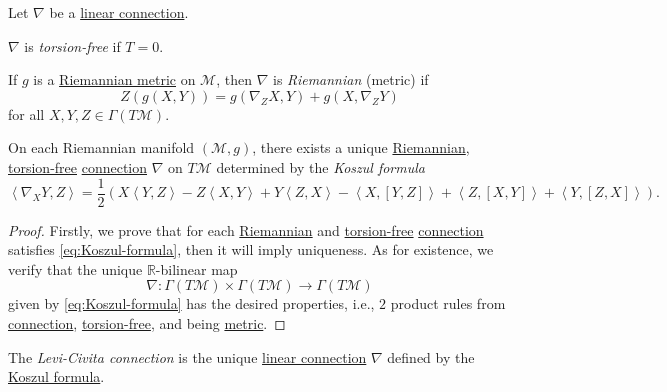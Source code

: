 \begin{definition*}
	Let \(\nabla \) be a \hyperref[def:linear-connection]{linear connection}.

	\begin{definition}\label{def:torsion-free}
		\(\nabla \) is \emph{torsion-free} if \(T = 0\).
	\end{definition}

	\begin{definition}[Riemannian]\label{def:Riemannian}
		If \(g\) is a \hyperref[def:Riemannian-metric]{Riemannian metric} on \(\mathcal{M} \), then \(\nabla \) is \emph{Riemannian} (metric) if
		\[
			Z(g(X, Y)) = g(\nabla _{Z} X, Y) + g(X, \nabla _{Z} Y)
		\]
		for all \(X, Y, Z\in \Gamma (T\mathcal{M} )\).
	\end{definition}
\end{definition*}

\begin{proposition}\label{prop:Koszul-formula}
	On each Riemannian manifold \((\mathcal{M} , g)\), there exists a unique \hyperref[def:Riemannian]{Riemannian}, \hyperref[def:torsion-free]{torsion-free} \hyperref[def:linear-connection]{connection} \(\nabla \) on \(T\mathcal{M} \) determined by the \emph{Koszul formula}
	\begin{equation}\label{eq:Koszul-formula}
		\left\langle \nabla _X Y, Z \right\rangle = \frac{1}{2} \left( X \left\langle Y, Z \right\rangle - Z\left\langle X, Y \right\rangle + Y\left\langle Z, X \right\rangle - \left\langle X, [Y, Z] \right\rangle + \left\langle Z, [X, Y] \right\rangle + \left\langle Y, [Z, X] \right\rangle \right).
	\end{equation}
\end{proposition}
\begin{proof}
	Firstly, we prove that for each \hyperref[def:Riemannian]{Riemannian} and \hyperref[def:torsion-free]{torsion-free} \hyperref[def:linear-connection]{connection} satisfies \autoref{eq:Koszul-formula}, then it will imply uniqueness. As for existence, we verify that the unique \(\mathbb{R} \)-bilinear map
	\[
		\nabla \colon \Gamma (T \mathcal{M} ) \times \Gamma (T \mathcal{M} )\to \Gamma (T\mathcal{M} )
	\]
	given by \autoref{eq:Koszul-formula} has the desired properties, i.e., \(2\) product rules from \hyperref[def:linear-connection]{connection}, \hyperref[def:torsion-free]{torsion-free}, and being \hyperref[def:Riemannian-metric]{metric}.
\end{proof}

\begin{definition}\label{def:Levi-Civita-connection}
	The \emph{Levi-Civita connection} is the unique \hyperref[def:linear-connection]{linear connection} \(\nabla \) defined by the \hyperref[eq:Koszul-formula]{Koszul formula}.
\end{definition}


